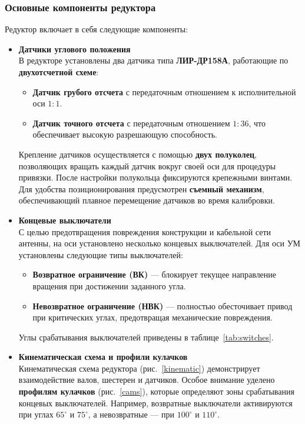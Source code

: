 \subsubsection{Основные компоненты редуктора}
Редуктор включает в себя следующие компоненты:
\begin{itemize}
    \item \textbf{Датчики углового положения} \\
    В редукторе установлены два датчика типа \textbf{ЛИР-ДР158А}, работающие по \textbf{двухотсчетной схеме}:
    \begin{itemize}
        \item \textbf{Датчик грубого отсчета} с передаточным отношением к исполнительной оси \(1:1\).
        \item \textbf{Датчик точного отсчета} с передаточным отношением \(1:36\), что обеспечивает высокую разрешающую способность.
    \end{itemize}
    Крепление датчиков осуществляется с помощью \textbf{двух полуколец}, позволяющих вращать каждый датчик вокруг своей оси для процедуры привязки. %
    После настройки полукольца фиксируются крепежными винтами. Для удобства позиционирования предусмотрен \textbf{съемный механизм}, 
    обеспечивающий плавное перемещение датчиков во время калибровки.

    \item \textbf{Концевые выключатели} \\
    С целью предотвращения повреждения конструкции и кабельной сети антенны, на оси установлено несколько концевых выключателей. 
    Для оси УМ установлены следующие типы выключателей:
    \begin{itemize}
        \item \textbf{Возвратное ограничение (ВК)} — блокирует текущее направление вращения при достижении заданного угла.
        \item \textbf{Невозвратное ограничение (НВК)} — полностью обесточивает привод при критических углах, предотвращая механические повреждения.
    \end{itemize}
    Углы срабатывания выключателей приведены в таблице~\ref{tab:switches}.

    \item \textbf{Кинематическая схема и профили кулачков} \\
    Кинематическая схема редуктора (рис.~\ref{kinematic}) демонстрирует взаимодействие валов, шестерен и датчиков. Особое внимание уделено \textbf{профилям кулачков} (рис.~\ref{cams}), 
    которые определяют зоны срабатывания концевых выключателей. 
    Например, возвратные выключатели активируются при углах \(65^\circ\) и \(75^\circ\), а невозвратные — при \(100^\circ\) и \(110^\circ\).
\end{itemize}

